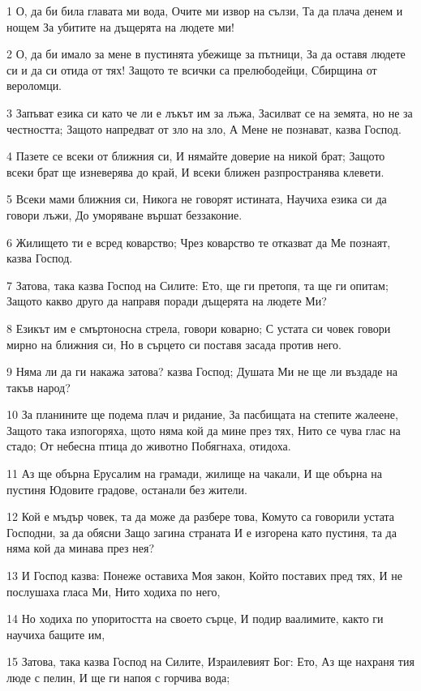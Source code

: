 \par 1 О, да би била главата ми вода, Очите ми извор на сълзи, Та да плача денем и нощем За убитите на дъщерята на людете ми!
\par 2 О, да би имало за мене в пустинята убежище за пътници, За да оставя людете си и да си отида от тях! Защото те всички са прелюбодейци, Сбирщина от вероломци.
\par 3 Запъват езика си като че ли е лъкът им за лъжа, Засилват се на земята, но не за честността; Защото напредват от зло на зло, А Мене не познават, казва Господ.
\par 4 Пазете се всеки от ближния си, И нямайте доверие на никой брат; Защото всеки брат ще изневерява до край, И всеки ближен разпространява клевети.
\par 5 Всеки мами ближния си, Никога не говорят истината, Научиха езика си да говори лъжи, До уморяване вършат беззаконие.
\par 6 Жилището ти е всред коварство; Чрез коварство те отказват да Ме познаят, казва Господ.
\par 7 Затова, така казва Господ на Силите: Ето, ще ги претопя, та ще ги опитам; Защото какво друго да направя поради дъщерята на людете Ми?
\par 8 Езикът им е смъртоносна стрела, говори коварно; С устата си човек говори мирно на ближния си, Но в сърцето си поставя засада против него.
\par 9 Няма ли да ги накажа затова? казва Господ; Душата Ми не ще ли въздаде на такъв народ?
\par 10 За планините ще подема плач и ридание, За пасбищата на степите жалеене, Защото така изпогоряха, щото няма кой да мине през тях, Нито се чува глас на стадо; От небесна птица до животно Побягнаха, отидоха.
\par 11 Аз ще обърна Ерусалим на грамади, жилище на чакали, И ще обърна на пустиня Юдовите градове, останали без жители.
\par 12 Кой е мъдър човек, та да може да разбере това, Комуто са говорили устата Господни, за да обясни Защо загина страната И е изгорена като пустиня, та да няма кой да минава през нея?
\par 13 И Господ казва: Понеже оставиха Моя закон, Който поставих пред тях, И не послушаха гласа Ми, Нито ходиха по него,
\par 14 Но ходиха по упоритостта на своето сърце, И подир ваалимите, както ги научиха бащите им,
\par 15 Затова, така казва Господ на Силите, Израилевият Бог: Ето, Аз ще нахраня тия люде с пелин, И ще ги напоя с горчива вода;
